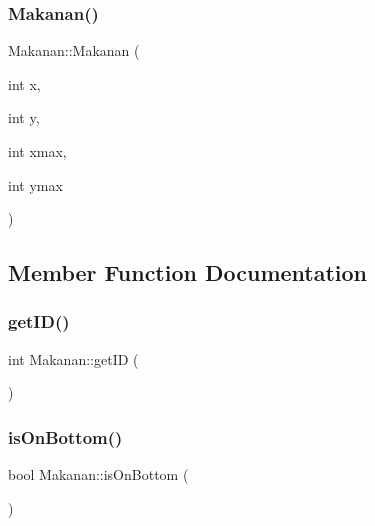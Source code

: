 \mbox{\label{class_makanan_a547f3e22ca69ff229ec25e3117dd96ed}} 
\subsubsection{\texorpdfstring{Makanan()}{Makanan()}\hspace{0.1cm}{\footnotesize\ttfamily [2/2]}}
{\footnotesize\ttfamily Makanan\+::\+Makanan (\begin{DoxyParamCaption}\item[{int}]{x,  }\item[{int}]{y,  }\item[{int}]{xmax,  }\item[{int}]{ymax }\end{DoxyParamCaption})}



\subsection{Member Function Documentation}
\mbox{\label{class_makanan_a0af9a28dae90b5509cfd60e6f3046655}} 
\subsubsection{\texorpdfstring{get\+I\+D()}{getID()}}
{\footnotesize\ttfamily int Makanan\+::get\+ID (\begin{DoxyParamCaption}{ }\end{DoxyParamCaption})}

\mbox{\label{class_makanan_a2d5537ee58ca99aed562aebdbb66de48}} 
\subsubsection{\texorpdfstring{is\+On\+Bottom()}{isOnBottom()}}
{\footnotesize\ttfamily bool Makanan\+::is\+On\+Bottom (\begin{DoxyParamCaption}{ }\end{DoxyParamCaption})}

\mbox{\label{class_makanan_abc0157c0c2133133104de97e1b1a07f0}} 
